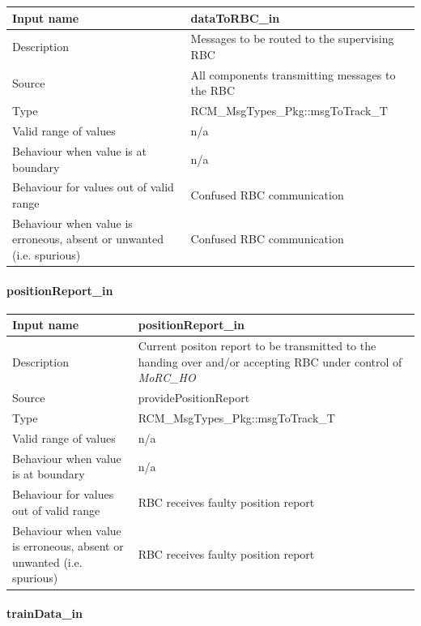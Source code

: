 \begin{longtable}{p{}p{}}
	\toprule
	Input name				& dataToRBC\_in \\
	\midrule
	Description				& Messages to be routed to the supervising RBC \\
	\midrule
	Source					& All components transmitting messages to the RBC \\ 
	\midrule
	Type					& RCM\_MsgTypes\_Pkg::msgToTrack\_T \\
	\midrule
	Valid range of values	& n/a \\
	\midrule
	Behaviour when value is at boundary	& n/a \\
	\midrule
	Behaviour for values out of valid range	& Confused RBC communication\\
	\midrule
	Behaviour when value is erroneous, absent or unwanted (i.e. spurious) & Confused RBC communication \\
	\bottomrule
\end{longtable}

\paragraph{positionReport\_in}

\begin{longtable}{p{}p{}}
	\toprule
	Input name				& positionReport\_in \\
	\midrule
	Description				& Current positon report to be transmitted to the handing over and/or accepting RBC under control of \emph{MoRC\_HO}\\
	\midrule
	Source					& providePositionReport \\ 
	\midrule
	Type					& RCM\_MsgTypes\_Pkg::msgToTrack\_T \\
	\midrule
	Valid range of values	& n/a \\
	\midrule
	Behaviour when value is at boundary	& n/a \\
	\midrule
	Behaviour for values out of valid range	& RBC receives faulty position report \\
	\midrule
	Behaviour when value is erroneous, absent or unwanted (i.e. spurious) & RBC receives faulty position report \\
	\bottomrule
\end{longtable}

\paragraph{trainData\_in}

